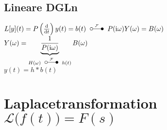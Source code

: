 \documentclass[german,color,6pt]{latex4ei/latex4ei_fs}
\begin{document}
\begin{sectionbox}
	\subsection{Lineare DGLn}
	$L[y](t) = P\left(\frac{\diff}{\diff t}\right)y(t) = b(t) \FT P(\i \omega)Y(\omega) = B(\omega)$\\
	$Y(\omega) = \underbrace{\frac{1}{P(\i \omega)}}_{H(\omega) \FT h(t)}B(\omega)$\\
	$y(t) = h*b(t)$
\end{sectionbox}



\section{Laplacetransformation \quad $\mathcal L\bigl(f(t)\bigr) = F(s)$}
\end{document}
